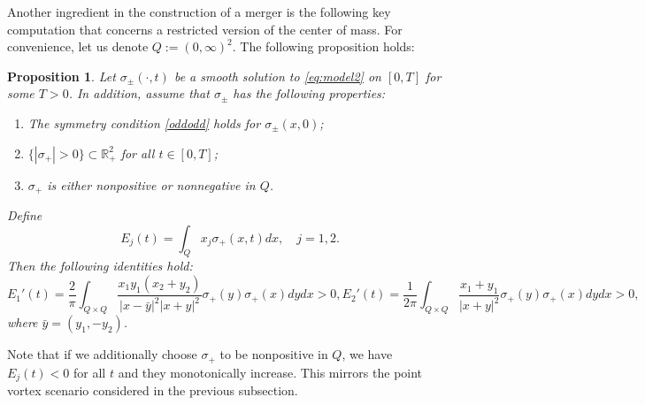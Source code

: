 \documentclass[11pt,reqno]{amsproc}
\newtheorem{prop}{Proposition}
\newcommand{\R}{\mathbb{R}}
\begin{document}
Another ingredient in the construction of a merger is the following key computation that concerns a restricted version of the center of mass. For convenience, let us denote $Q := (0,\infty)^2$. The following proposition holds:
\begin{prop}\label{prop:center}
    Let $\sigma_\pm(\cdot,t)$ be a smooth solution to \eqref{eq:model2} on $[0,T]$ for some $T > 0$. In addition, assume that $\sigma_\pm$ has the following properties:
    \begin{enumerate}
        \item The symmetry condition \eqref{oddodd} holds for $\sigma_\pm(x,0)$;
        \item $\{|\sigma_+| > 0\} \subset \R^2_+$ for all $t \in [0,T]$;
        \item $\sigma_+$ is either nonpositive or nonnegative in $Q$. 
    \end{enumerate}
    Define 
    $$
    E_j(t) = \int_Q x_j \sigma_+(x,t) dx,\quad j=1,2.
    $$
    Then the following identities hold:
    \begin{subequations}
    \begin{equation}
        \label{eq:E1'}
        E_1'(t) = \frac2\pi \int_{Q\times Q} \frac{x_1y_1(x_2 + y_2)}{|x-\bar y|^2 |x+y|^2}\sigma_+(y)\sigma_+(x)dydx > 0,
    \end{equation}  
    \begin{equation}
        \label{eq:E2'}
        E_2'(t) = \frac{1}{2\pi}\int_{Q\times Q} \frac{x_1 + y_1}{|x+y|^2}\sigma_+(y)\sigma_+(x)dydx > 0,
    \end{equation}  
    \end{subequations}
    where $\bar{y} = (y_1,-y_2)$.
\end{prop}
Note that if we additionally choose $\sigma_+$ to be nonpositive in $Q$, we have $E_j(t) < 0$ for all $t$ and they monotonically increase. This mirrors the point vortex scenario considered in the previous subsection. 
\end{document}
